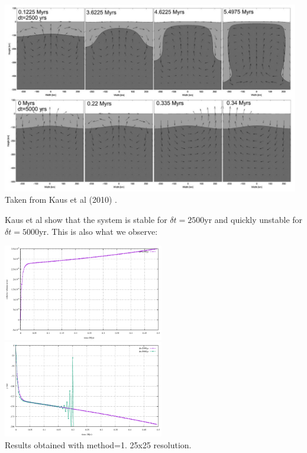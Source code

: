 \begin{center}
\includegraphics[width=13cm]{python_codes/fieldstone_54/images/exp9/kamm10}\\
{\captionfont Taken from Kaus et al (2010) \cite{kamm10}.}
\end{center}
Kaus et al show that the system is stable for $\delta t=2500$yr and 
quickly unstable for $\delta t=5000$yr. This is also what we observe:

\begin{center}
\includegraphics[width=7cm]{python_codes/fieldstone_54/images/exp9/volume.pdf}
\includegraphics[width=7cm]{python_codes/fieldstone_54/images/exp9/elev.pdf}\\
{\captionfont Results obtained with method=1. 25x25 resolution.}
\end{center}

